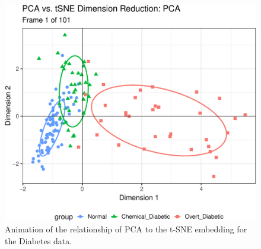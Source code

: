 \documentclass[
  letterpaper,
  10pt,
  krantz2]{krantz}
\begin{document}
{\begin{figure}[H]
{\includegraphics[width=1\textwidth,height=\textheight]{figs/ch04/fig-diabetes-pca-tsne-anim-1.pdf}

}

\caption{\label{fig-diabetes-pca-tsne-anim-1}Animation of the
relationship of PCA to the t-SNE embedding for the Diabetes data.}

\end{figure}%

\begin{figure}[H]

\end{figure}}
\end{document}

